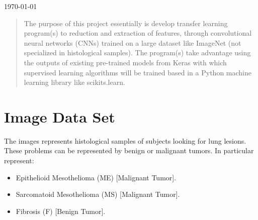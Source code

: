 \documentclass[12pt]{article} %
\begin{document}
\begin{titlepage}
{\large \today}\\[3cm] %


\vfill %

\end{titlepage}


\tableofcontents %

\newpage %

\begin{abstract}
The purpose of this project essentially is develop transfer learning program(s) to reduction and extraction of features, through convolutional neural networks (CNNs) trained on a large dataset like ImageNet (not specialized in histological samples). The program(s) take advantage using the outputs of existing pre-trained models from Keras with which supervised learning algorithms will be trained based in a Python machine learning library like scikits.learn.

\end{abstract}
\newpage
\section{Image Data Set}
The images represents histological samples of subjects looking for lung lesions. These problems can be represented by benign or malignant tumors.
In particular represent:
\begin{itemize}
\item Epithelioid Mesothelioma (ME)  [Malignant Tumor].
\item Sarcomatoid Mesothelioma (MS)  [Malignant Tumor].
\item Fibrosis (F) [Benign Tumor].
\end{itemize}
\end{document}
